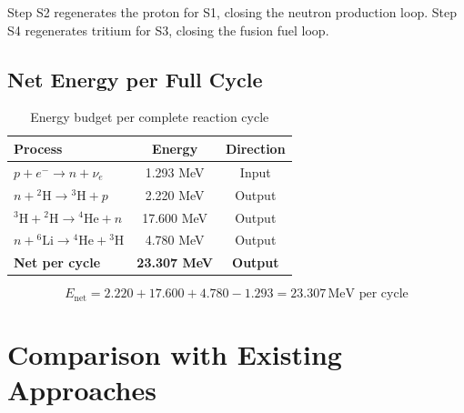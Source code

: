 \documentclass[12pt,a4paper]{article}
\begin{document}
Step S2 regenerates the proton for S1, closing the neutron
production loop. Step S4 regenerates tritium for S3, closing
the fusion fuel loop.

\subsection{Net Energy per Full Cycle}

\begin{table}[h!]
\centering
\caption{Energy budget per complete reaction cycle}
\vspace{0.5em}
\begin{tabular}{lcc}
\toprule
\textbf{Process} & \textbf{Energy} & \textbf{Direction} \\
\midrule
$p + e^- \rightarrow n + \nu_e$                          & 1.293 MeV  & Input  \\
$n + {}^2\text{H} \rightarrow {}^3\text{H} + p$         & 2.220 MeV  & Output \\
${}^3\text{H} + {}^2\text{H} \rightarrow {}^4\text{He} + n$ & 17.600 MeV & Output \\
$n + {}^6\text{Li} \rightarrow {}^4\text{He} + {}^3\text{H}$ & 4.780 MeV  & Output \\
\midrule
\textbf{Net per cycle} & \textbf{23.307 MeV} & \textbf{Output} \\
\bottomrule
\end{tabular}
\end{table}

\begin{equation}
  \boxed{E_\text{net} = 2.220 + 17.600 + 4.780 - 1.293
  = 23.307\,\text{MeV per cycle}}
\end{equation}

\section{Comparison with Existing Approaches}
\end{document}
